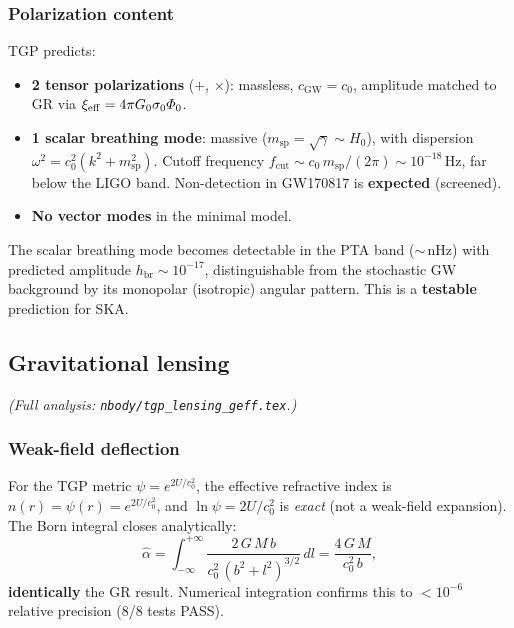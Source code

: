 \subsubsection{Polarization content}

TGP predicts:
\begin{itemize}[nosep]
  \item \textbf{2 tensor polarizations} ($+$, $\times$):
        massless, $c_{\mathrm{GW}}=c_{0}$, amplitude matched
        to GR via $\xi_{\mathrm{eff}}=4\pi G_{0}\sigma_{0}\varPhi_0$.
  \item \textbf{1 scalar breathing mode}: massive
        ($m_{\mathrm{sp}}=\sqrt{\gamma}\sim H_{0}$), with
        dispersion $\omega^{2}=c_{0}^{2}(k^{2}+m_{\mathrm{sp}}^{2})$.
        Cutoff frequency $f_{\mathrm{cut}}\sim c_{0}\,m_{\mathrm{sp}}
        /(2\pi)\sim 10^{-18}$\,Hz, far below the LIGO band.
        Non-detection in GW170817 is \textbf{expected} (screened).
  \item \textbf{No vector modes} in the minimal model.
\end{itemize}

The scalar breathing mode becomes detectable in the PTA band
($\sim$\,nHz) with predicted amplitude $h_{\mathrm{br}}\sim 10^{-17}$,
distinguishable from the stochastic GW background by its monopolar
(isotropic) angular pattern.  This is a \textbf{testable} prediction
for SKA.

\subsection{Gravitational lensing}\label{ssec:lensing-summary}

\noindent\textit{(Full analysis: \texttt{nbody/tgp\_lensing\_geff.tex}.)}

\subsubsection{Weak-field deflection}

For the TGP metric $\psi=e^{2U/c_{0}^{2}}$, the effective
refractive index is $n(r)=\psi(r)=e^{2U/c_{0}^{2}}$, and
$\ln\psi=2U/c_{0}^{2}$ is \emph{exact} (not a weak-field
expansion).  The Born integral closes analytically:
\begin{equation}\label{eq:deflection}
  \hat\alpha
  = \int_{-\infty}^{+\infty}
    \frac{2\,G\,M\,b}{c_{0}^{2}\,(b^{2}+l^{2})^{3/2}}\,dl
  = \frac{4\,G\,M}{c_{0}^{2}\,b},
\end{equation}
\textbf{identically} the GR result.  Numerical integration
confirms this to $<10^{-6}$ relative precision (8/8 tests PASS).

